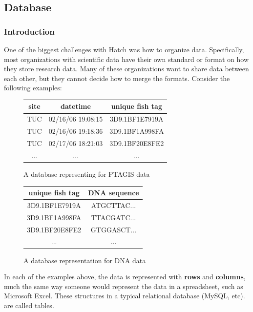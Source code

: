 \subsection{Database}

\subsubsection{Introduction}
One of the biggest challenges with Hatch was how to organize data. Specifically,
most organizations with scientific data have their own standard or format on 
how they store research data. Many of these organizations want to share data between 
each other, but they cannot decide how to merge the formats. Consider the following
examples:

\begin{figure}[h]
	\begin{center}
	\begin{tabular}{ | c | c | c | }
		\hline
		site	&	datetime		&	unique fish tag	\\
		\hline
		TUC	&	02/16/06 19:08:15 	&	3D9.1BF1E7919A 	\\
		TUC	&	02/16/06 19:18:36 	&	3D9.1BF1A998FA 	\\
		TUC	&	02/17/06 18:21:03 	&	3D9.1BF20E8FE2	\\
		...	&	...			&	...		\\
		\hline
	\end{tabular}
	\caption{A database representing for PTAGIS data} 
	\label{ptagis_ex1}
	\end{center}
\end{figure}

\begin{figure}[h]
	\begin{center}
	\begin{tabular}{ | c | c | }
		\hline
		unique fish tag	&	DNA sequence	\\
		\hline
		3D9.1BF1E7919A 	&	ATGCTTAC...	\\
		3D9.1BF1A998FA 	&	TTACGATC...	\\
		3D9.1BF20E8FE2	&	GTGGASCT...	\\
		...		&	...		\\
		\hline
	\end{tabular}
	\caption{A database representation for DNA data} 
	\label{dna_ex1}
	\end{center}
\end{figure}

In each of the examples above, the data is represented with \textbf{rows} and
\textbf{columns}, much the same way someone would represent the data in a
spreadsheet, such as Microsoft Excel. These structures in a typical
relational database (MySQL, etc).  are called tables.

